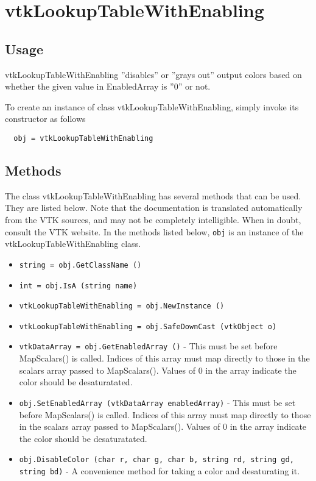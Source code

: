 \section{vtkLookupTableWithEnabling}

\subsection{Usage}

 vtkLookupTableWithEnabling ''disables'' or ''grays out'' output colors
 based on whether the given value in EnabledArray is ''0'' or not. 



To create an instance of class vtkLookupTableWithEnabling, simply
invoke its constructor as follows
\begin{verbatim}
  obj = vtkLookupTableWithEnabling
\end{verbatim}
\subsection{Methods}

The class vtkLookupTableWithEnabling has several methods that can be used.
  They are listed below.
Note that the documentation is translated automatically from the VTK sources,
and may not be completely intelligible.  When in doubt, consult the VTK website.
In the methods listed below, \verb|obj| is an instance of the vtkLookupTableWithEnabling class.
\begin{itemize}
\item  \verb|string = obj.GetClassName ()|

\item  \verb|int = obj.IsA (string name)|

\item  \verb|vtkLookupTableWithEnabling = obj.NewInstance ()|

\item  \verb|vtkLookupTableWithEnabling = obj.SafeDownCast (vtkObject o)|

\item  \verb|vtkDataArray = obj.GetEnabledArray ()| -  This must be set before MapScalars() is called.
 Indices of this array must map directly to those in the scalars array
 passed to MapScalars(). 
 Values of 0 in the array indicate the color should be desaturatated. 

\item  \verb|obj.SetEnabledArray (vtkDataArray enabledArray)| -  This must be set before MapScalars() is called.
 Indices of this array must map directly to those in the scalars array
 passed to MapScalars(). 
 Values of 0 in the array indicate the color should be desaturatated. 

\item  \verb|obj.DisableColor (char r, char g, char b, string rd, string gd, string bd)| -  A convenience method for taking a color and desaturating it.  

\end{itemize}
